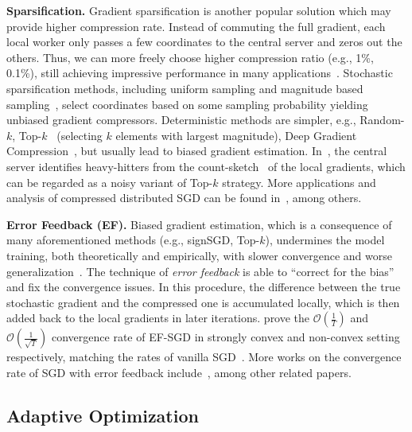 \documentclass[11pt]{article}
\begin{document}
\textbf{Sparsification.}\hspace{0.1in} Gradient sparsification is another popular solution which may provide higher compression rate. Instead of commuting the full gradient, each local worker only passes a few coordinates to the central server and zeros out the others. Thus, we can more freely choose higher compression ratio (e.g., 1\%, 0.1\%), still achieving impressive performance in many applications~\cite{Proc:Lin_ICLR18}. Stochastic sparsification methods, including uniform sampling and magnitude based sampling~\cite{wangni2018gradient}, select coordinates based on some sampling probability yielding unbiased gradient compressors. Deterministic methods are simpler, e.g., Random-$k$, Top-$k$~\cite{stich2018sparsified,shi2019convergence} (selecting $k$ elements with largest magnitude), Deep Gradient Compression~\cite{Proc:Lin_ICLR18}, but usually lead to biased gradient estimation. In~\cite{Proc:Ivkin_NIPS19}, the central server identifies heavy-hitters from the count-sketch~\cite{Proc:Charikar_ICALP02} of the local gradients, which can be regarded as a noisy variant of Top-$k$ strategy. More applications and analysis of compressed distributed SGD can be found in~\cite{jiang2018linear,Proc:Shen_ICML18,alistarh2018convergence,Proc:Basu_NIPS19,Proc:Jiang_SIGMOD18}, among others.

\textbf{Error Feedback (EF).}\hspace{0.1in} Biased gradient estimation, which is a consequence of many aforementioned methods (e.g., signSGD, Top-$k$), undermines the model training, both theoretically and empirically, with slower convergence and worse generalization~\cite{ajalloeian2020analysis,Arxiv:Beznosikov20}. The technique of \textit{error feedback} is able to ``correct for the bias'' and fix the convergence issues. 
In this procedure, the difference between the true stochastic gradient and the compressed one is accumulated locally, which is then added back to the local gradients in later iterations. \cite{stich2018sparsified,karimireddy2019error} prove the $\mathcal O(\frac{1}{T})$ and $\mathcal O(\frac{1}{\sqrt T})$ convergence rate of EF-SGD in strongly convex and non-convex setting respectively, matching the rates of vanilla SGD~\cite{nemirovski2009robust,ghadimi2013stochastic}. More works on the convergence rate of SGD with error feedback include~\cite{Proc:Zheng_NIPS19,Article:Stich_arxiv19}, among other related papers.

\vspace{-0.05in}
\subsection{Adaptive Optimization}
\vspace{-0.05in}
\end{document}
